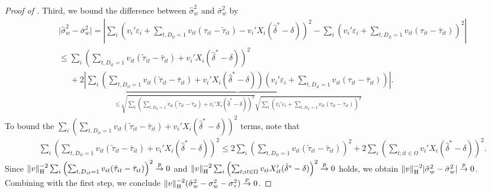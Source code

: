 \documentclass[english,11pt]{article}
\theoremstyle{plain}
\theoremstyle{plain}
\theoremstyle{plain}
\theoremstyle{plain}
\let\ref\Cref
\begin{document}
\begin{proof}[Proof of \ref{thm:se}]
Third, we bound the difference between $\hat{\sigma}_{w}^{2}$ and
$\bar{\sigma}_{w}^{2}$ by
\begin{align*}
 & \lvert\hat{\sigma}_{w}^{2}-\bar{\sigma}_{w}^{2}\rvert=\left|\sum_{i}\left(v_{i}'\varepsilon_{i}+\sum_{t,D_{it}=1}v_{it}(\tau_{it}-\tilde{\tau}_{it})-v_{i}'X_{i}(\hat{\delta}^{*}-\delta)\right)^{2}-\sum_{i}\left(v_{i}'\varepsilon_{i}+\sum_{t,D_{it}=1}v_{it}(\tau_{it}-\bar{\tau}_{it})\right)^{2}\right|\\
 & \leq\sum_{i}\left(\sum_{t,D_{it}=1}v_{it}(\tilde{\tau}_{it}-\bar{\tau}_{it})+v_{i}'X_{i}(\hat{\delta}^{*}-\delta)\right)^{2}\\
 & \phantom{\le}+2\underbrace{\left|\sum_{i}\left(\sum_{t,D_{it}=1}v_{it}(\tilde{\tau}_{it}-\bar{\tau}_{it})+v_{i}'X_{i}(\hat{\delta}^{*}-\delta)\right)\left(v_{i}'\varepsilon_{i}+\sum_{t,D_{it}=1}v_{it}(\tau_{it}-\bar{\tau}_{it})\right)\right|}_{\leq\sqrt{\sum_{i}\left(\sum_{t,D_{it}=1}v_{it}(\tilde{\tau}_{it}-\bar{\tau}_{it})+v_{i}'X_{i}(\hat{\delta}^{*}-\delta)\right)^{2}}\sqrt{\sum_{i}\left(v_{i}'\varepsilon_{i}+\sum_{t,D_{it}=1}v_{it}(\tau_{it}-\bar{\tau}_{it})\right)^{2}}}.
\end{align*}
To bound the $\sum_{i}\left(\sum_{t,D_{it}=1}v_{it}(\tilde{\tau}_{it}-\bar{\tau}_{it})+v_{i}'X_{i}(\hat{\delta}^{*}-\delta)\right)^{2}$
terms, note that 
\begin{align*}
 & \sum_{i}\left(\sum_{t,D_{it}=1}v_{it}(\tilde{\tau}_{it}{-}\bar{\tau}_{it})+v_{i}'X_{i}(\hat{\delta}^{*}{-}\delta)\right)^{2}\leq2\sum_{i}\left(\sum_{t,D_{it}=1}v_{it}(\tilde{\tau}_{it}{-}\bar{\tau}_{it})\right)^{2}+2\sum_{i}\left(\sum_{t;it\in\Omega}v_{i}'X_{i}(\hat{\delta}^{*}{-}\delta)\right)^{2}.
\end{align*}
Since $\|v\|_{\textnormal{H}}^{-2}\sum_{i}\left(\sum_{t,D_{it}=1}v_{it}(\tilde{\tau}_{it}-\bar{\tau}_{it})\right)^{2}\stackrel{p}{\rightarrow}0$
and $\|v\|_{\textnormal{H}}^{-2}\sum_{i}\left(\sum_{t;it\in\Omega}v_{it}X_{it}'(\hat{\delta}^{\ast}-\delta)\right)^{2}\stackrel{p}{\rightarrow}0$
holds, we obtain $\|v\|_{\textnormal{H}}^{-2}\lvert\hat{\sigma}_{w}^{2}-\bar{\sigma}_{w}^{2}\rvert\stackrel{p}{\rightarrow}0$.
Combining with the first step, we conclude $\|v\|_{\textnormal{H}}^{-2}(\hat{\sigma}_{w}^{2}-\sigma_{w}^{2}-\sigma_{\tau}^{2})\stackrel{p}{\rightarrow}0$.
\end{proof}
\end{document}
